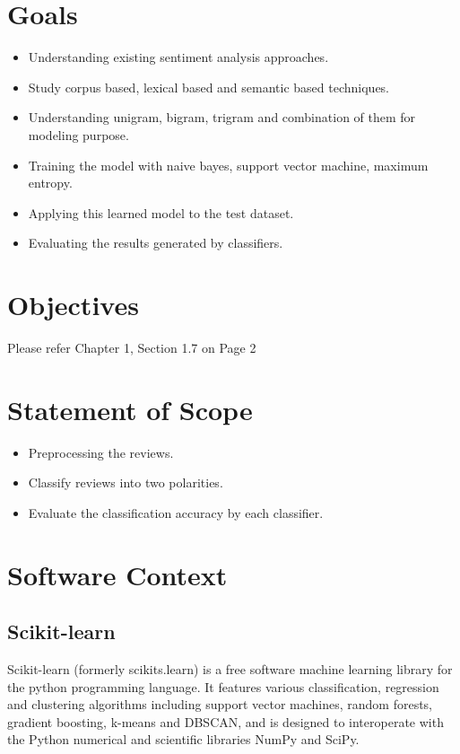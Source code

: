 \documentclass[oneside,a4paper,12pt]{pictreport}
\begin{document}
\section{Goals}
\begin{itemize}
\item Understanding existing sentiment analysis approaches.
\item Study corpus based, lexical based and semantic based techniques.
\item Understanding unigram, bigram, trigram and combination of them for modeling purpose.
\item Training the model with naive bayes, support vector machine, maximum entropy.
\item Applying this learned model to the test dataset.
\item Evaluating the results generated by classifiers.
\end{itemize}

\section{Objectives}

Please refer Chapter 1, Section 1.7 on Page 2

\section{Statement of Scope}
\begin{itemize}
\item Preprocessing the reviews.
\item Classify reviews into two polarities.
\item Evaluate the classification accuracy by each classifier.
\end{itemize}

\section{Software Context}
\subsection{Scikit-learn} 
Scikit-learn (formerly scikits.learn) is a free software machine learning library for the 
python programming language. It features various classification, regression and clustering
algorithms including support vector machines, random forests, gradient boosting,
k-means and DBSCAN, and is designed to interoperate with the Python numerical and scientific libraries NumPy and SciPy.
\end{document}
